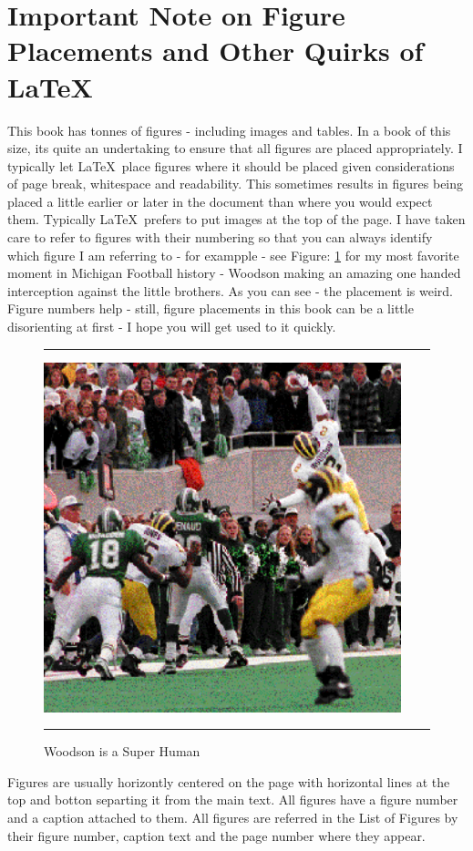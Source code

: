\documentclass[11pt, letterpaper, twoside]{memoir}\usepackage{knitr}
\begin{document}
\section*{Important Note on Figure Placements and Other Quirks of \LaTeX}

This book has tonnes of figures - including images and tables. In a book of this size, its quite an undertaking to ensure that all figures are placed appropriately. I typically let \LaTeX\ place figures where it should be placed given considerations of page break, whitespace and readability. This sometimes results in figures being placed a little earlier or later in the document than where you would expect them. Typically \LaTeX\ prefers to put images at the top of the page. I have taken care to refer to figures with their numbering so that you can always identify which figure I am referring to - for exampple - see Figure: \ref{fig:woodson} for my most favorite moment in Michigan Football history - Woodson making an amazing one handed interception against the little brothers. As you can see - the placement is weird. Figure numbers help - still, figure placements in this book can be a little disorienting at first - I hope you will get used to it quickly.

\begin{figure}
\rule{4in}{1pt}
\centering
\includegraphics[height=4in]{images/woodson.png}
\caption{Woodson is a Super Human}
\label{fig:woodson}
\rule{4in}{1pt}
\end{figure}

Figures are usually horizontly centered on the page with horizontal lines at the top and botton separting it from the main text. All figures have a figure number and a caption attached to them. All figures are referred in the List of Figures by their figure number, caption text and the page number where they appear. 
\end{document}
